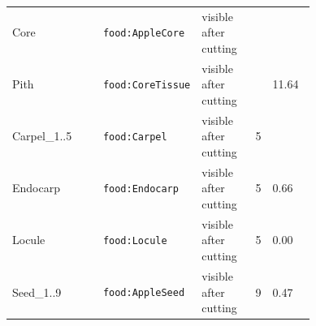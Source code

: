 \documentclass[10.5pt,a4paper]{article}
\begin{document}
\begin{table}[htbp]
\begin{tabularx}{\linewidth}{@{}p{0.30\linewidth}p{0.27\linewidth}p{0.17\linewidth}rX@{}}
\hspace*{0.0em}Core & \texttt{food:AppleCore} & visible after cutting &  &  \\
\hspace*{0.9em}Pith & \texttt{food:CoreTissue} & visible after cutting &  & 11.64 \\
\hspace*{0.9em}Carpel\_1..5 & \texttt{food:Carpel} & visible after cutting & 5 &  \\
\hspace*{1.8em}Endocarp & \texttt{food:Endocarp} & visible after cutting & 5 & 0.66 \\
\hspace*{1.8em}Locule & \texttt{food:Locule} & visible after cutting & 5 & 0.00 \\
\hspace*{1.8em}Seed\_1..9 & \texttt{food:AppleSeed} & visible after cutting & 9 & 0.47 \\\bottomrule\end{tabularx}\end{table}
\end{document}

